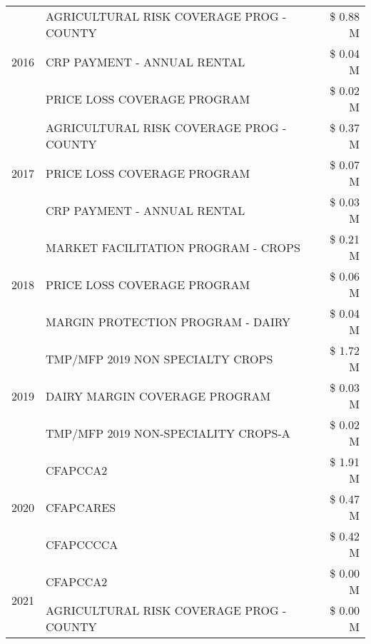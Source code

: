 \begin{tabular}{llr}
\cline{1-3}
\multirow[t]{3}{*}{2016} & AGRICULTURAL RISK COVERAGE PROG - COUNTY & \$ 0.88 M \\
 & CRP PAYMENT - ANNUAL RENTAL & \$ 0.04 M \\
 & PRICE LOSS COVERAGE PROGRAM & \$ 0.02 M \\
\cline{1-3}
\multirow[t]{3}{*}{2017} & AGRICULTURAL RISK COVERAGE PROG - COUNTY & \$ 0.37 M \\
 & PRICE LOSS COVERAGE PROGRAM & \$ 0.07 M \\
 & CRP PAYMENT - ANNUAL RENTAL & \$ 0.03 M \\
\cline{1-3}
\multirow[t]{3}{*}{2018} & MARKET FACILITATION PROGRAM - CROPS & \$ 0.21 M \\
 & PRICE LOSS COVERAGE PROGRAM & \$ 0.06 M \\
 & MARGIN PROTECTION PROGRAM - DAIRY & \$ 0.04 M \\
\cline{1-3}
\multirow[t]{3}{*}{2019} & TMP/MFP 2019 NON SPECIALTY CROPS & \$ 1.72 M \\
 & DAIRY MARGIN COVERAGE PROGRAM & \$ 0.03 M \\
 & TMP/MFP 2019 NON-SPECIALITY CROPS-A & \$ 0.02 M \\
\cline{1-3}
\multirow[t]{3}{*}{2020} & CFAPCCA2 & \$ 1.91 M \\
 & CFAPCARES & \$ 0.47 M \\
 & CFAPCCCCA & \$ 0.42 M \\
\cline{1-3}
\multirow[t]{2}{*}{2021} & CFAPCCA2 & \$ 0.00 M \\
 & AGRICULTURAL RISK COVERAGE PROG - COUNTY & \$ 0.00 M \\
\cline{1-3}
\bottomrule
\end{tabular}
